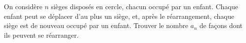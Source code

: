 On considère $n$ sièges disposés en cercle, chacun occupé par un enfant. Chaque enfant peut se déplacer d'au plus un siège, et, après le réarrangement, chaque siège est de nouveau occupé par un enfant. Trouver le nombre $a_n$ de façons dont ils peuvent se réarranger.
